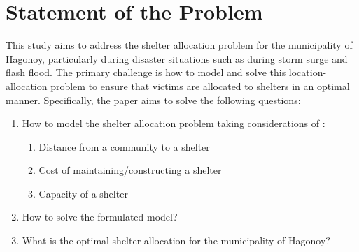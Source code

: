 \section{Statement of the Problem}

This study aims to address the shelter allocation problem for the municipality of Hagonoy, particularly during disaster situations such as during storm surge and flash flood. The primary challenge is how to model and solve this location-allocation problem to ensure that victims are allocated to shelters in an optimal manner. Specifically, the paper aims to solve the following questions:

\begin{enumerate}
	\item How to model the shelter allocation problem taking considerations of :
	\begin{enumerate}
		\item Distance from a community to a shelter
		\item Cost of maintaining/constructing a shelter
		\item Capacity of a shelter
	\end{enumerate}
	\item How to solve the formulated model?
	\item What is the optimal shelter allocation for the municipality of Hagonoy?
\end{enumerate}